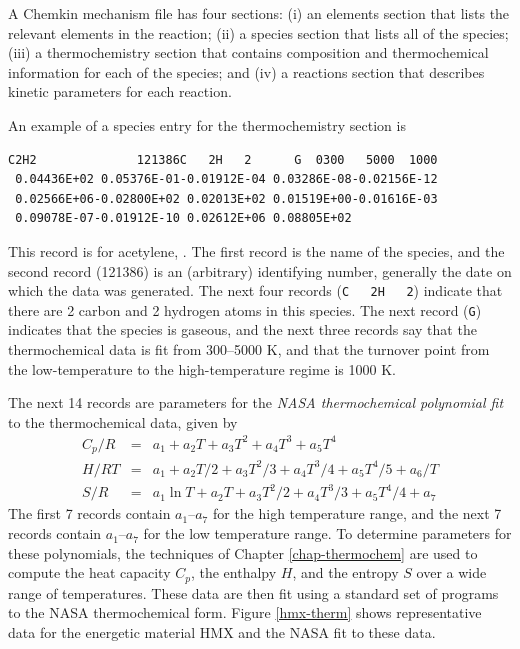 A Chemkin mechanism file has four sections: (i) an elements section
that lists the relevant elements in the reaction; (ii) a species
section that lists all of the species; (iii) a thermochemistry section
that contains composition and thermochemical information for each of
the species; and (iv) a reactions section that describes kinetic
parameters for each reaction.

An example of a species entry for the thermochemistry section is
\begin{verbatim}
C2H2              121386C   2H   2      G  0300   5000  1000  
 0.04436E+02 0.05376E-01-0.01912E-04 0.03286E-08-0.02156E-12
 0.02566E+06-0.02800E+02 0.02013E+02 0.01519E+00-0.01616E-03
 0.09078E-07-0.01912E-10 0.02612E+06 0.08805E+02               
\end{verbatim}
This record is for acetylene, . The first record is the
name of the species, and the second record (121386) is an (arbitrary)
identifying number, generally the date on which the data was
generated. The next four records (\verb:C   2H   2:) indicate that
there are 2 carbon and 2 hydrogen atoms in this species. The next
record (\verb:G:) indicates that the species is gaseous, and the next
three records say that the thermochemical data is fit from 300--5000
K, and that the turnover point from the low-temperature to the
high-temperature regime is 1000 K.

The next 14 records are parameters for the \emph{NASA thermochemical
polynomial fit} to the thermochemical data, given by
\begin{eqnarray}
C_p/R &=& a_1 + a_2T + a_3T^2 + a_4T^3 + a_5T^4\\
H/RT &=& a_1 + a_2T/2 + a_3T^2/3 + a_4T^3/4 + a_5T^4/5 + a_6/T\\
S/R &=& a_1\ln T + a_2T + a_3T^2/2 + a_4T^3/3 + a_5T^4/4 + a_7
\end{eqnarray}
The first 7 records contain $a_1$--$a_7$ for the high temperature
range, and the next 7 records contain $a_1$--$a_7$ for the low
temperature range.  To determine parameters for these polynomials, the
techniques of Chapter \ref{chap-thermochem} are used to compute the
heat capacity $C_p$, the enthalpy $H$, and the entropy $S$ over a wide
range of temperatures. These data are then fit using a standard set of
programs to the NASA thermochemical form. Figure \ref{hmx-therm} shows
representative data for the energetic material HMX and the NASA fit to
these data.

